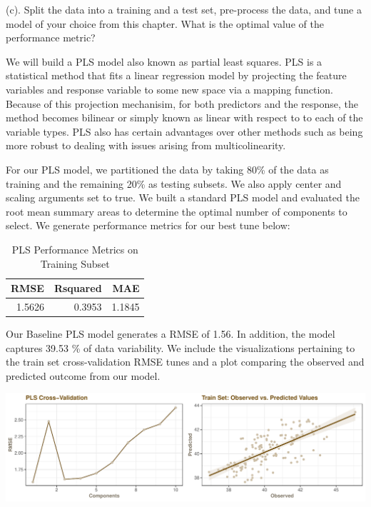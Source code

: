 \documentclass[]{report}
\begin{document}
\begin{subquestion}{(c).} Split the data into a training and a test set, pre-process the data, and tune a model of your choice from this chapter. What is the optimal value of the performance metric? 
\end{subquestion}

We will build a PLS model also known as partial least squares. PLS is a
statistical method that fits a linear regression model by projecting the
feature variables and response variable to some new space via a mapping
function. Because of this projection mechanisim, for both predictors and
the response, the method becomes bilinear or simply known as linear with
respect to to each of the variable types. PLS also has certain
advantages over other methods such as being more robust to dealing with
issues arising from multicolinearity.

For our PLS model, we partitioned the data by taking 80\% of the data as
training and the remaining 20\% as testing subsets. We also apply center
and scaling arguments set to true. We built a standard PLS model and
evaluated the root mean summary areas to determine the optimal number of
components to select. We generate performance metrics for our best tune
below:

\begin{table}[H]

\caption{\label{tab:kj-6.3c}PLS Performance Metrics on Training Subset}
\centering
\fontsize{8}{10}\selectfont
\begin{tabular}{rrr}
\toprule
\textbf{RMSE} & \textbf{Rsquared} & \textbf{MAE}\\
\midrule
\rowcolor{gray!6}  1.5626 & 0.3953 & 1.1845\\
\bottomrule
\end{tabular}
\end{table}

Our Baseline PLS model generates a RMSE of 1.56. In addition, the model
captures 39.53 \% of data variability. We include the visualizations
pertaining to the train set cross-validation RMSE tunes and a plot
comparing the observed and predicted outcome from our model.

\includegraphics{Homework-Two_files/figure-latex/kj-6.3c2-1.pdf}
\end{document}

